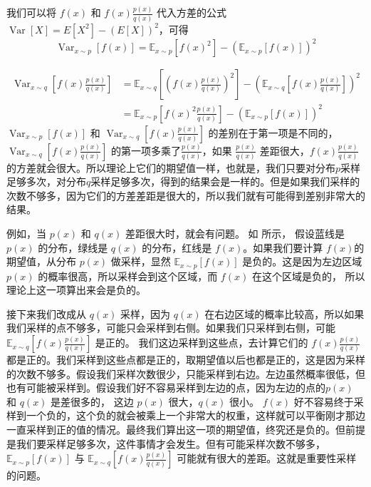 我们可以将 $f(x)$ 和 $f(x) \frac{p(x)}{q(x)}$ 代入方差的公式 $\operatorname{Var}[X]=E\left[X^{2}\right]-(E[X])^{2}$，可得
\begin{equation}
    \label{eq:}
    \operatorname{Var}_{x \sim p}[f(x)]=\mathbb{E}_{x \sim p}\left[f(x)^{2}\right]-\left(\mathbb{E}_{x \sim p}[f(x)]\right)^{2}
\end{equation}

\begin{equation}
    \label{eq:}
    \begin{aligned}
        \operatorname{Var}_{x \sim q}\left[f(x) \frac{p(x)}{q(x)}\right] &=\mathbb{E}_{x \sim q}\left[\left(f(x) \frac{p(x)}{q(x)}\right)^{2}\right]-\left(\mathbb{E}_{x \sim q}\left[f(x) \frac{p(x)}{q(x)}\right]\right)^{2} \\
        &=\mathbb{E}_{x \sim p}\left[f(x)^{2} \frac{p(x)}{q(x)}\right]-\left(\mathbb{E}_{x \sim p}[f(x)]\right)^{2}
        \end{aligned}
\end{equation}
$\operatorname{Var}_{x \sim p}[f(x)]$ 和 $\operatorname{Var}_{x \sim q}\left[f(x) \frac{p(x)}{q(x)}\right]$ 的差别在于第一项是不同的， $\operatorname{Var}_{x \sim q}\left[f(x) \frac{p(x)}{q(x)}\right]$ 的第一项多乘了$\frac{p(x)}{q(x)}$，如果 $\frac{p(x)}{q(x)}$ 差距很大，$f(x)\frac{p(x)}{q(x)}$ 的方差就会很大。所以理论上它们的期望值一样，也就是，我们只要对分布$p$采样足够多次，对分布$q$采样足够多次，得到的结果会是一样的。但是如果我们采样的次数不够多，因为它们的方差差距是很大的，所以我们就有可能得到差别非常大的结果。

例如，当 $p(x)$ 和 $q(x)$ 差距很大时，就会有问题。
如 所示，
假设蓝线是 $p(x)$  的分布，绿线是 $q(x)$  的分布，红线是 $f(x)$。如果我们要计算 $f(x)$的期望值，从分布 $p(x)$ 做采样，显然 $\mathbb{E}_{x \sim p}[f(x)]$ 是负的。这是因为左边区域 $p(x)$ 的概率很高，所以采样会到这个区域，而 $f(x)$ 在这个区域是负的， 所以理论上这一项算出来会是负的。

接下来我们改成从 $q(x)$ 采样，因为 $q(x)$ 在右边区域的概率比较高，所以如果我们采样的点不够多，可能只会采样到右侧。如果我们只采样到右侧，可能 $\mathbb{E}_{x \sim q}\left[f(x) \frac{p(x)}{q(x)}\right]$ 是正的。
我们这边采样到这些点，去计算它们的 $f(x) \frac{p(x)}{q(x)}$ 都是正的。我们采样到这些点都是正的，取期望值以后也都是正的，这是因为采样的次数不够多。假设我们采样次数很少，只能采样到右边。左边虽然概率很低，但也有可能被采样到。假设我们好不容易采样到左边的点，因为左边的点的$p(x)$ 和 $q(x)$ 是差很多的， 这边 $p(x)$ 很大，$q(x)$ 很小。 $f(x)$ 好不容易终于采样到一个负的，这个负的就会被乘上一个非常大的权重，这样就可以平衡刚才那边一直采样到正的值的情况。最终我们算出这一项的期望值，终究还是负的。但前提是我们要采样足够多次，这件事情才会发生。但有可能采样次数不够多，$\mathbb{E}_{x \sim p}[f(x)]$ 与 $\mathbb{E}_{x \sim q}\left[f(x) \frac{p(x)}{q(x)}\right]$ 可能就有很大的差距。这就是重要性采样的问题。

